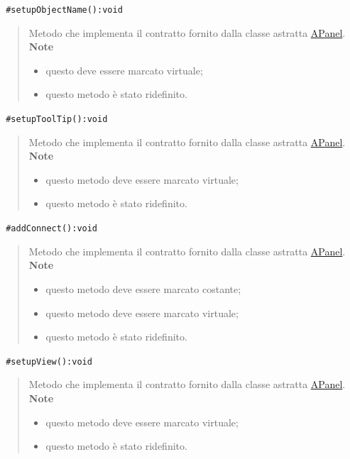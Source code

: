 \color{blue}\verb! #setupObjectName():void!
\begin{quote}
\color{black}Metodo che implementa il contratto fornito dalla classe astratta \hyperref[speAPanel]{APanel}.\\
 \textbf{Note}
 \begin{itemize}
  \item questo deve essere marcato virtuale;
 \item questo metodo è stato ridefinito.
 \end{itemize}
\end{quote} 
\color{blue}\verb! #setupToolTip():void!
\begin{quote}
\color{black}Metodo che implementa il contratto fornito dalla classe astratta \hyperref[speAPanel]{APanel}.\\
 \textbf{Note}
 \begin{itemize}
 \item questo metodo deve essere marcato virtuale;
 \item questo metodo è stato ridefinito.
 \end{itemize}
\end{quote} 
\color{blue}\verb! #addConnect():void!
\begin{quote}
\color{black}Metodo che implementa il contratto fornito dalla classe astratta \hyperref[speAPanel]{APanel}.\\
 \textbf{Note}
 \begin{itemize}
 \item questo metodo deve essere marcato costante;
 \item questo metodo deve essere marcato virtuale;
 \item questo metodo è stato ridefinito.
 \end{itemize}
\end{quote} 
\color{blue}\verb! #setupView():void!
\begin{quote}
\color{black}Metodo che implementa il contratto fornito dalla classe astratta \hyperref[speAPanel]{APanel}.\\
 \textbf{Note}
 \begin{itemize}
 \item questo metodo deve essere marcato virtuale;
 \item questo metodo è stato ridefinito.
 \end{itemize}
\end{quote}
\pagebreak
\color{black}
